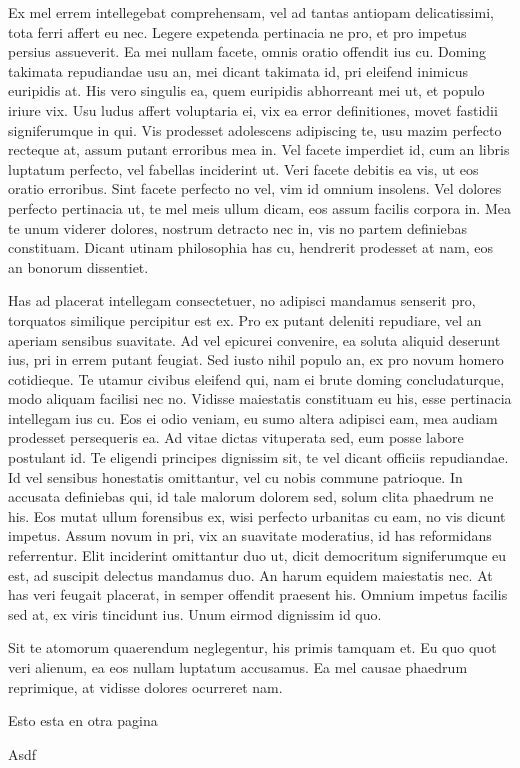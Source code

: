 \documentclass{memoria}
\begin{document}
Ex mel errem intellegebat comprehensam, vel
ad tantas antiopam delicatissimi, tota ferri affert eu nec. Legere expetenda
pertinacia ne pro, et pro impetus persius assueverit. Ea mei nullam facete,
omnis oratio offendit ius cu. Doming takimata repudiandae usu an, mei dicant
takimata id, pri eleifend inimicus euripidis at. His vero singulis ea, quem
euripidis abhorreant mei ut, et populo iriure vix. Usu ludus affert voluptaria
ei, vix ea error definitiones, movet fastidii signiferumque in qui. Vis
prodesset adolescens adipiscing te, usu mazim perfecto recteque at, assum putant
erroribus mea in. Vel facete imperdiet id, cum an libris luptatum perfecto, vel
fabellas inciderint ut. Veri facete debitis ea vis, ut eos oratio erroribus.
Sint facete perfecto no vel, vim id omnium insolens. Vel dolores perfecto
pertinacia ut, te mel meis ullum dicam, eos assum facilis corpora in. Mea te
unum viderer dolores, nostrum detracto nec in, vis no partem definiebas
constituam. Dicant utinam philosophia has cu, hendrerit prodesset at nam, eos an
bonorum dissentiet. 



Has ad placerat intellegam consectetuer, no adipisci
mandamus senserit pro, torquatos similique percipitur est ex. Pro ex putant
deleniti repudiare, vel an aperiam sensibus suavitate. Ad vel epicurei
convenire, ea soluta aliquid deserunt ius, pri in errem putant feugiat. Sed
iusto nihil populo an, ex pro novum homero cotidieque. Te utamur civibus
eleifend qui, nam ei brute doming concludaturque, modo aliquam facilisi nec no.
Vidisse maiestatis constituam eu his, esse pertinacia intellegam ius cu. Eos ei
odio veniam, eu sumo altera adipisci eam, mea audiam prodesset persequeris ea.
Ad vitae dictas vituperata sed, eum posse labore postulant id. Te eligendi
principes dignissim sit, te vel dicant officiis repudiandae. Id vel sensibus
honestatis omittantur, vel cu nobis commune patrioque. In accusata definiebas
qui, id tale malorum dolorem sed, solum clita phaedrum ne his. Eos mutat ullum
forensibus ex, wisi perfecto urbanitas cu eam, no vis dicunt impetus. Assum
novum in pri, vix an suavitate moderatius, id has reformidans referrentur. Elit
inciderint omittantur duo ut, dicit democritum signiferumque eu est, ad suscipit
delectus mandamus duo. An harum equidem maiestatis nec. At has veri feugait
placerat, in semper offendit praesent his. Omnium impetus facilis sed at, ex
viris tincidunt ius. Unum eirmod dignissim id quo. 


Sit te atomorum quaerendum neglegentur, his primis tamquam et. Eu quo quot veri
alienum, ea eos nullam luptatum accusamus. Ea mel causae phaedrum reprimique, at
vidisse dolores ocurreret nam.  

\newpage
Esto esta en otra pagina

Asdf
\end{document}
